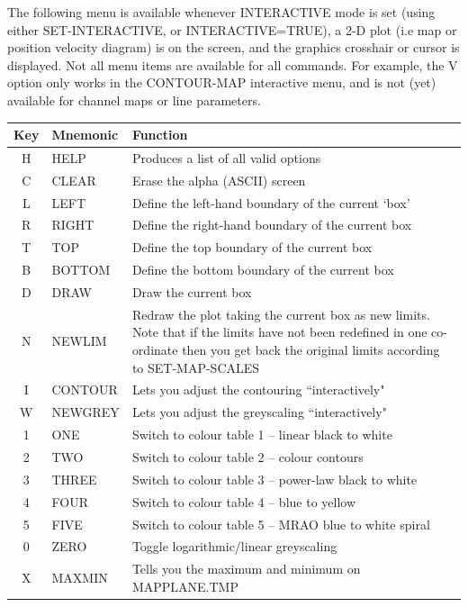 \documentclass[11pt,twoside]{report}
\begin{document}
The following menu is available whenever INTERACTIVE mode is set (using
either SET-INTERACTIVE, or INTERACTIVE=TRUE), a 2-D plot (i.e map or
position velocity diagram) is on the screen, and the graphics crosshair
or cursor is displayed. Not all menu items are available for all commands.
For example, the V option only works in the CONTOUR-MAP interactive menu,
and is not (yet) available for channel maps or line parameters.

\begin{table}[htbp]
\begin{center}
\begin{tabular}{|c|l|l|} \hline
Key & Mnemonic & Function \\ \hline
H &HELP &Produces a list of all valid options\\
C &CLEAR &Erase the alpha (ASCII) screen\\
L &LEFT &Define the left-hand boundary of the current `box'\\
R &RIGHT &Define the right-hand boundary of the current box\\
T &TOP &Define the top boundary of the current box\\
B &BOTTOM &Define the bottom boundary of the current box\\
D &DRAW &Draw the current box\\
N & NEWLIM & \parbox[t]{3.7in}{ Redraw the plot taking the current box as new
                      limits. Note that if the limits have not been
                      redefined in one co-ordinate then you get back the
                      original limits according to SET-MAP-SCALES} \\
I & CONTOUR & Lets you adjust the contouring ``interactively"\\
W & NEWGREY & Lets you adjust the greyscaling ``interactively"\\
1 & ONE     & Switch to colour table 1 -- linear black to white\\
2 & TWO     & Switch to colour table 2 -- colour contours\\
3 & THREE   & Switch to colour table 3 -- power-law black to white\\
4 & FOUR    & Switch to colour table 4 -- blue to yellow\\
5 & FIVE    & Switch to colour table 5 -- MRAO blue to white spiral\\
0 & ZERO    & Toggle logarithmic/linear greyscaling\\
X & MAXMIN & Tells you the maximum and minimum on MAPPLANE.TMP\\

\end{tabular}
\end{center}
\end{table}
\end{document}
